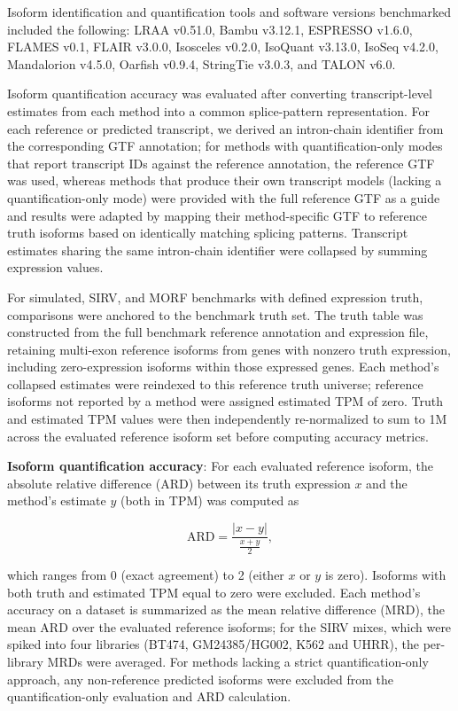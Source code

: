 Isoform identification and quantification tools and software versions benchmarked included the following: LRAA v0.51.0, Bambu v3.12.1, ESPRESSO v1.6.0, FLAMES v0.1, FLAIR v3.0.0, Isosceles v0.2.0, IsoQuant v3.13.0, IsoSeq v4.2.0, Mandalorion v4.5.0, Oarfish v0.9.4, StringTie v3.0.3, and TALON v6.0.

Isoform quantification accuracy was evaluated after converting transcript-level estimates from each method into a common splice-pattern representation. For each reference or predicted transcript, we derived an intron-chain identifier from the corresponding GTF annotation; for methods with quantification-only modes that report transcript IDs against the reference annotation, the reference GTF was used, whereas methods that produce their own transcript models (lacking a quantification-only mode) were provided with the full reference GTF as a guide and results were adapted by mapping their method-specific GTF to reference truth isoforms based on identically matching splicing patterns. Transcript estimates sharing the same intron-chain identifier were collapsed by summing expression values.

For simulated, SIRV, and MORF benchmarks with defined expression truth, comparisons were anchored to the benchmark truth set. The truth table was constructed from the full benchmark reference annotation and expression file, retaining multi-exon reference isoforms from genes with nonzero truth expression, including zero-expression isoforms within those expressed genes. Each method's collapsed estimates were reindexed to this reference truth universe; reference isoforms not reported by a method were assigned estimated TPM of zero. Truth and estimated TPM values were then independently re-normalized to sum to 1M across the evaluated reference isoform set before computing accuracy metrics.

\textbf{Isoform quantification accuracy}: For each evaluated reference isoform, the absolute relative difference (ARD) between its truth expression $x$ and the method's estimate $y$ (both in TPM) was computed as

\[\text{ARD} = \frac{|x - y|}{\frac{x + y}{2}},\]

which ranges from 0 (exact agreement) to 2 (either $x$ or $y$ is zero). Isoforms with both truth and estimated TPM equal to zero were excluded. Each method's accuracy on a dataset is summarized as the mean relative difference (MRD), the mean ARD over the evaluated reference isoforms; for the SIRV mixes, which were spiked into four libraries (BT474, GM24385/HG002, K562 and UHRR), the per-library MRDs were averaged. For methods lacking a strict quantification-only approach, any non-reference predicted isoforms were excluded from the quantification-only evaluation and ARD calculation.

